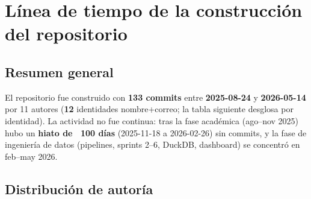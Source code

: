 \section{Línea de tiempo de la construcción del repositorio}
\label{sec:timeline}

\subsection{Resumen general}

El repositorio fue construido con \textbf{133 commits} entre
\textbf{2025-08-24} y \textbf{2026-05-14} por 11
autores (\textbf{12} identidades nombre+correo; la tabla
siguiente desglosa por identidad). La actividad no fue continua: tras la fase
académica (ago--nov 2025) hubo un \textbf{hiato de ~100 días} (2025-11-18 a
2026-02-26) sin commits, y la fase de ingeniería de datos (pipelines,
sprints 2--6, DuckDB, dashboard) se concentró en feb--may 2026.

\subsection{Distribución de autoría}

